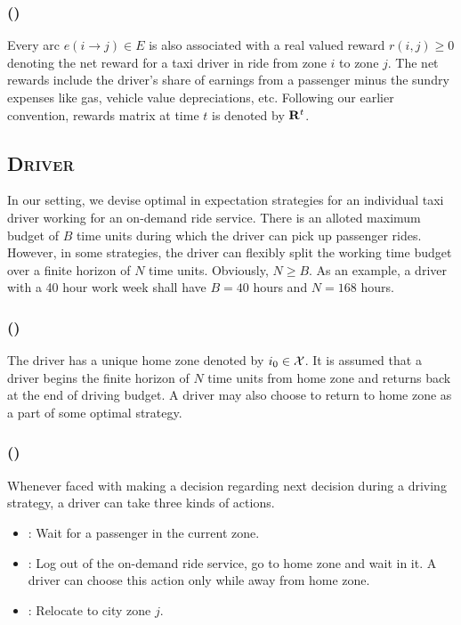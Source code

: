 \subsubsection{ (\rewardsmatrix)}

Every arc $e(i \rightarrow j) \in E$ is also associated with a real valued reward $r(i,j) \geq 0$ denoting
the net reward for a taxi driver in ride from zone $i$ to zone $j$. The net rewards include the driver's
share of earnings from a passenger minus the sundry expenses like gas, vehicle value depreciations, etc.
Following our earlier convention, rewards matrix at time $t$ is denoted by ${\mathbf{R}}^t$.

\subsection{\textsc{Driver}}

In our setting, we devise optimal in expectation strategies for an individual taxi driver working for an
on-demand ride service. There is an alloted maximum budget of $B$ time units during which the driver can pick
up passenger rides. However, in some strategies, the driver can flexibly split the working time budget 
over a finite horizon of $N$ time units. Obviously, $N \geq B$. As an example, a driver with a 40 hour work week
shall have $B=40$ hours and $N=168$ hours.

\subsubsection{ (\homezone)}

The driver has a unique home zone denoted by $i_0 \in \mathcal{X}$. It is assumed that a driver begins the finite horizon of $N$
time units from home zone and returns back at the end of driving budget. A driver may also choose to return to 
home zone as a part of some optimal strategy.

\subsubsection{ (\actionsset)}

Whenever faced with making a decision regarding next decision during a driving strategy, a driver can take three kinds
of actions.

\begin{itemize}
	\item {\getpassenger} \getpassengeraction: Wait for a passenger in the current zone. 
	\item {\gohome} \gohomeaction: Log out of the on-demand ride service, go to home zone and wait in it. A driver can
	choose this action only while away from home zone.
	\item {\relocate} \relocateaction: Relocate to city zone $j$.
\end{itemize}

